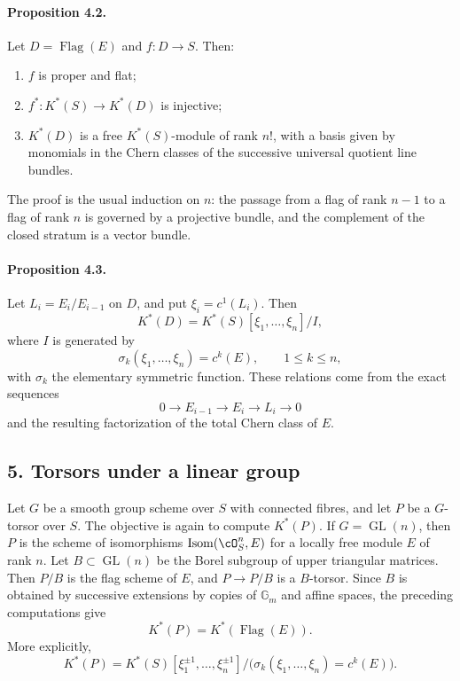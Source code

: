 \documentclass[11pt]{article}
\theoremstyle{plain}
\theoremstyle{definition}
\theoremstyle{remark}
\newcommand{\GG}{\mathbb G}
\DeclareMathOperator{\Isom}{Isom}
\providecommand{\Drap}{\operatorname{Flag}}
\providecommand{\Gl}{\operatorname{GL}}
\begin{document}
\paragraph{Proposition 4.2.}
Let $D=\Drap(E)$ and $f:D\to S$. Then:
\begin{enumerate}[label=\roman*)]
\item $f$ is proper and flat;
\item $f^*:K^*(S)\to K^*(D)$ is injective;
\item $K^*(D)$ is a free $K^*(S)$-module of rank $n!$, with a basis given by monomials in the Chern classes of the successive universal quotient line bundles.
\end{enumerate}
The proof is the usual induction on $n$: the passage from a flag of rank $n-1$ to a flag of rank $n$ is governed by a projective bundle, and the complement of the closed stratum is a vector bundle.

\paragraph{Proposition 4.3.}
Let $L_i=E_i/E_{i-1}$ on $D$, and put $\xi_i=c^1(L_i)$. Then
\[
K^*(D)=K^*(S)[\xi_1,\ldots,\xi_n]/I,
\]
where $I$ is generated by
\[
\sigma_k(\xi_1,\ldots,\xi_n)=c^k(E),\qquad 1\leq k\leq n,
\]
with $\sigma_k$ the elementary symmetric function. These relations come from the exact sequences
\[
0\to E_{i-1}\to E_i\to L_i\to0
\]
and the resulting factorization of the total Chern class of $E$.

\subsection*{5. Torsors under a linear group}

Let $G$ be a smooth group scheme over $S$ with connected fibres, and let $P$ be a $G$-torsor over $S$. The objective is again to compute $K^*(P)$. If $G=\Gl(n)$, then $P$ is the scheme of isomorphisms $\Isom(\cO_S^n,E)$ for a locally free module $E$ of rank $n$. Let $B\subset\Gl(n)$ be the Borel subgroup of upper triangular matrices. Then $P/B$ is the flag scheme of $E$, and $P\to P/B$ is a $B$-torsor. Since $B$ is obtained by successive extensions by copies of $\GG_m$ and affine spaces, the preceding computations give
\[
K^*(P)=K^*(\Drap(E)).
\]
More explicitly,
\[
K^*(P)=K^*(S)[\xi_1^{\pm1},\ldots,\xi_n^{\pm1}]/\bigl(\sigma_k(\xi_1,\ldots,\xi_n)=c^k(E)\bigr).
\]
\end{document}
